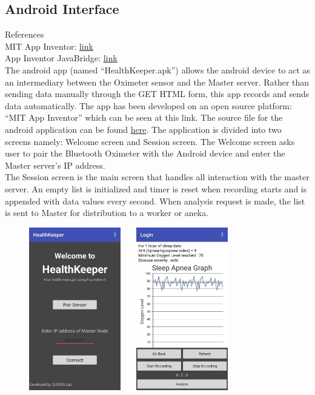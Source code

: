 \documentclass[10pt,journal,compsoc]{IEEEtran}
\begin{document}
\subsection{Android Interface}
References \\
MIT App Inventor: \href{http://appinventor.mit.edu/explore/front.html}{link} \\
App Inventor JavaBridge: \href{http://www.appinventor.org/jBridgeIntro}{link} \\
The android app (named “HealthKeeper.apk”) allows the android device to act as an intermediary between the Oximeter sensor and the Master server. Rather than sending data manually through the GET HTML form, this app records and sends data automatically. The app has been developed on an open source platform: “MIT App Inventor” which can be seen at this link. The source file for the android application can be found \href{https://drive.google.com/open?id=1rPIf_NHuBXp6peUX3vkzqJg5hfht3KDC}{here}. The application is divided into two screens namely: Welcome screen and Session screen. The Welcome screen asks user to pair the Bluetooth Oximeter with the Android device and enter the Master server’s IP address. \\
The Session screen is the main screen that handles all interaction with the master server. An empty list is initialized and timer is reset when recording starts and is appended with data values every second. When analysis request is made, the list is sent to Master for distribution to a worker or aneka.

\begin{figure}[h]
\centering
\includegraphics[width=4cm]{welcome}  \ \ \    
\includegraphics[width=4cm]{session}
\end{figure}
\end{document}

